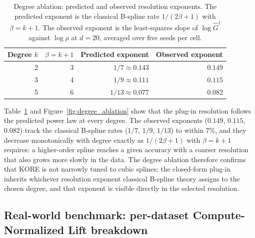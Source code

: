 \documentclass{article}
\newcommand{\KORE}{\textsc{KORE}}
\begin{document}
\begin{table}[h]
\caption{Degree ablation: predicted and observed resolution exponents. The predicted exponent is the classical B-spline rate $1 / (2\beta + 1)$ with $\beta = k + 1$. The observed exponent is the least-squares slope of $\log\widehat{G}^\dagger$ against $\log\rho$ at $d = 20$, averaged over five seeds per cell.}
\label{tab:degree_ablation}
\centering
\small
\begin{tabular}{@{}rrrr@{}}
\toprule
Degree $k$ & $\beta = k+1$ & Predicted exponent & Observed exponent \\
\midrule
2 & 3 & $1/7 \approx 0.143$ & $0.149$ \\
3 & 4 & $1/9 \approx 0.111$ & $0.115$ \\
5 & 6 & $1/13 \approx 0.077$ & $0.082$ \\
\bottomrule
\end{tabular}
\end{table}

Table~\ref{tab:degree_ablation} and Figure~\ref{fig:degree_ablation} show that the plug-in resolution follows the predicted power law at every degree. The observed exponents ($0.149$, $0.115$, $0.082$) track the classical B-spline rates ($1/7$, $1/9$, $1/13$) to within $7\%$, and they decrease monotonically with degree exactly as $1/(2\beta+1)$ with $\beta = k+1$ requires: a higher-order spline reaches a given accuracy with a coarser resolution that also grows more slowly in the data. The degree ablation therefore confirms that \KORE{} is not narrowly tuned to cubic splines: the closed-form plug-in inherits whichever resolution exponent classical B-spline theory assigns to the chosen degree, and that exponent is visible directly in the selected resolution.

\subsection{Real-world benchmark: per-dataset Compute-Normalized Lift breakdown}
\label{sec:app_real_data}
\end{document}
